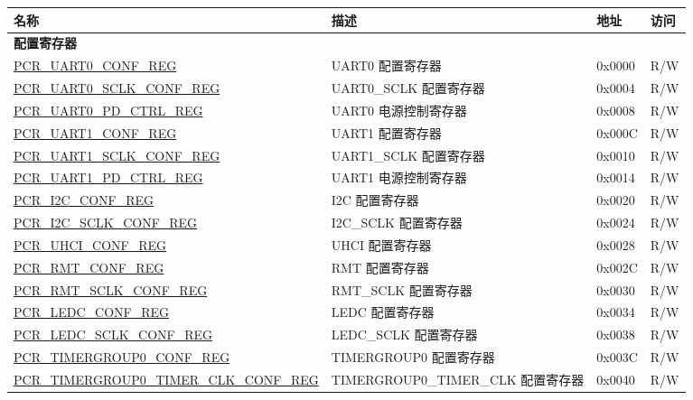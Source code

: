 \begin{longtable}{ | p{6cm} | p{7.2cm} | p{1.3cm} | p{1cm} | }
\hline\rowcolor{lightgray}
\textbf{名称} & \textbf{描述} &  \textbf{地址} & \textbf{访问} \\ \hline
\endhead
\multicolumn{4}{|l|}{\textbf{配置寄存器}} \\ \hline
\hyperref[regdesc:PCRUART0CONFREG]{PCR\_UART0\_CONF\_REG} & UART0 配置寄存器 & 0x0000 & R/W \\ \hline
\hyperref[regdesc:PCRUART0SCLKCONFREG]{PCR\_UART0\_SCLK\_CONF\_REG} & UART0\_SCLK 配置寄存器 & 0x0004 & R/W \\ \hline
\hyperref[regdesc:PCRUART0PDCTRLREG]{PCR\_UART0\_PD\_CTRL\_REG} & UART0 电源控制寄存器 & 0x0008 & R/W \\ \hline
\hyperref[regdesc:PCRUART1CONFREG]{PCR\_UART1\_CONF\_REG} & UART1 配置寄存器 & 0x000C & R/W \\ \hline
\hyperref[regdesc:PCRUART1SCLKCONFREG]{PCR\_UART1\_SCLK\_CONF\_REG} & UART1\_SCLK 配置寄存器 & 0x0010 & R/W \\ \hline
\hyperref[regdesc:PCRUART1PDCTRLREG]{PCR\_UART1\_PD\_CTRL\_REG} & UART1 电源控制寄存器 & 0x0014 & R/W \\ \hline
\hyperref[regdesc:PCRI2CCONFREG]{PCR\_I2C\_CONF\_REG} & I2C 配置寄存器 & 0x0020 & R/W \\ \hline
\hyperref[regdesc:PCRI2CSCLKCONFREG]{PCR\_I2C\_SCLK\_CONF\_REG} & I2C\_SCLK 配置寄存器 & 0x0024 & R/W \\ \hline
\hyperref[regdesc:PCRUHCICONFREG]{PCR\_UHCI\_CONF\_REG} & UHCI 配置寄存器 & 0x0028 & R/W \\ \hline
\hyperref[regdesc:PCRRMTCONFREG]{PCR\_RMT\_CONF\_REG} & RMT 配置寄存器 & 0x002C & R/W \\ \hline
\hyperref[regdesc:PCRRMTSCLKCONFREG]{PCR\_RMT\_SCLK\_CONF\_REG} & RMT\_SCLK 配置寄存器 & 0x0030 & R/W \\ \hline
\hyperref[regdesc:PCRLEDCCONFREG]{PCR\_LEDC\_CONF\_REG} & LEDC 配置寄存器 & 0x0034 & R/W \\ \hline
\hyperref[regdesc:PCRLEDCSCLKCONFREG]{PCR\_LEDC\_SCLK\_CONF\_REG} & LEDC\_SCLK 配置寄存器 & 0x0038 & R/W \\ \hline
\hyperref[regdesc:PCRTIMERGROUP0CONFREG]{PCR\_TIMERGROUP0\_CONF\_REG} & TIMERGROUP0 配置寄存器 & 0x003C & R/W \\ \hline
\hyperref[regdesc:PCRTIMERGROUP0TIMERCLKCONFREG]{PCR\_TIMERGROUP0\_TIMER\_CLK\_\newline CONF\_REG} & TIMERGROUP0\_TIMER\_CLK 配置寄存器 & 0x0040 & R/W \\ \hline

\end{longtable}
